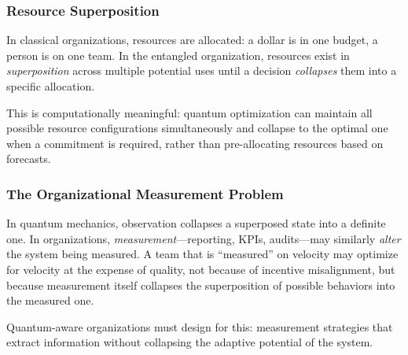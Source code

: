 \documentclass[11pt,a4paper,twocolumn]{article}
\begin{document}
\subsubsection{Resource Superposition}
In classical organizations, resources are allocated: a dollar is in one budget, a person is on one team. In the entangled organization, resources exist in \textit{superposition} across multiple potential uses until a decision \textit{collapses} them into a specific allocation.

This is computationally meaningful: quantum optimization can maintain all possible resource configurations simultaneously and collapse to the optimal one when a commitment is required, rather than pre-allocating resources based on forecasts.

\subsubsection{The Organizational Measurement Problem}
In quantum mechanics, observation collapses a superposed state into a definite one. In organizations, \textit{measurement}---reporting, KPIs, audits---may similarly \textit{alter} the system being measured. A team that is ``measured'' on velocity may optimize for velocity at the expense of quality, not because of incentive misalignment, but because measurement itself collapses the superposition of possible behaviors into the measured one.

Quantum-aware organizations must design for this: measurement strategies that extract information without collapsing the adaptive potential of the system.
\end{document}
